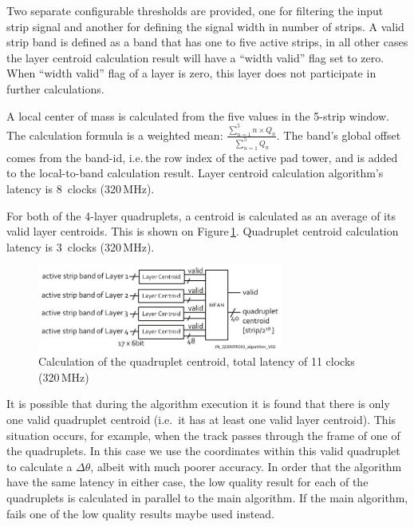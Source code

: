 \FloatBarrier   %

\vspace{8mm}

Two separate configurable thresholds are provided, one for filtering the input strip signal
and another for defining the signal width in number of strips.
A valid strip band is defined as a band that has one to five active strips,
in all other cases the layer centroid calculation result will have a ``width valid'' flag set to zero.
When ``width valid'' flag of a layer is zero, this layer does not participate in further calculations.

A local center of mass is calculated from the five values in the 5-strip window.
The calculation formula is a weighted mean:
$\frac{\sum_{n=1}^{5} n \times Q_n}{\sum_{n=1}^{5} Q_n}$.
The band's global offset comes from the band-id, i.e.\,the row index of the active pad tower,
and is added to the local-to-band calculation result. Layer centroid calculation algorithm's latency is 8~clocks (320\,MHz).

For both of the 4-layer quadruplets, a centroid is calculated as an average of its valid layer centroids.
This is shown on Figure\,\ref{fig:JN_QCENTROID_algorithm}. Quadruplet centroid calculation latency is 3~clocks (320\,MHz).

\begin{figure}[h]
   \centering
   \includegraphics[width=0.72\textwidth]{figures/JN_QCENTROID_algorithm_V02.pdf}
   \caption{Calculation of the quadruplet centroid, total latency of 11 clocks (320\,MHz)}
   \label{fig:JN_QCENTROID_algorithm}
\end{figure}

It is possible that during the algorithm execution it is found that there is only one valid quadruplet centroid (i.e.\ it has at least one valid layer centroid).
This situation occurs, for example, when the track passes through the frame of one of the quadruplets.
In this case we use the coordinates within this valid quadruplet to calculate a $\Delta\theta$, albeit with much poorer accuracy.
In order that the algorithm have the same latency in either case,
the low quality result for each of the quadruplets is calculated in parallel to the main algorithm.
If the main algorithm, fails one of the low quality results maybe used instead.


